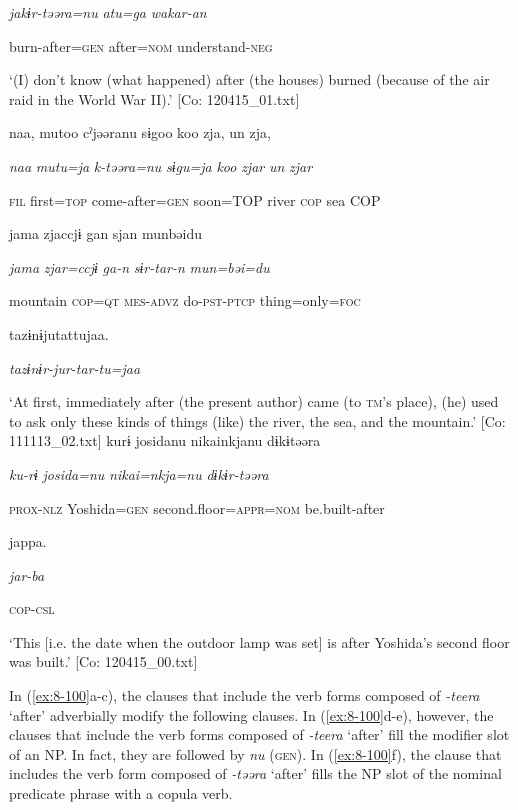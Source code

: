       \textit{jakɨr-təəra=nu}  \textit{atu=ga}  \textit{wakar-an}

      burn-after=\textsc{gen}  after=\textsc{nom}  understand-\textsc{neg}

\glt ‘(I) don’t know (what happened) after (the houses) burned (because of the air raid in the World War II).’ [Co: 120415\_01.txt]

    {\TM}
\glll  naa,  mutoo  cˀjəəranu  sɨgoo  koo  zja,  un  zja,

      \textit{naa}  \textit{mutu=ja}  \textit{k-təəra=nu}  \textit{sɨgu=ja}  \textit{koo}  \textit{zjar}  \textit{un}  \textit{zjar}

      \textsc{fil}  first=\textsc{top}  come-after=\textsc{gen}  soon=TOP  river  \textsc{cop}  sea  COP

      jama  zjaccjɨ  gan  sjan  munbəidu

      \textit{jama}  \textit{zjar=ccjɨ}  \textit{ga-n}  \textit{sɨr-tar-n}  \textit{mun=bəi=du}

      mountain  \textsc{cop}=\textsc{qt}  \textsc{mes}-\textsc{advz}  do-\textsc{pst}-\textsc{ptcp}  thing=only=\textsc{foc}

      tazɨnɨjutattujaa.

      \textit{tazɨnɨr-jur-tar-tu=jaa}

\glt ‘At first, immediately after (the present author) came (to \textsc{tm}’s place), (he) used to ask only these kinds of things (like) the river, the sea, and the mountain.’ [Co: 111113\_02.txt]
\ex {\TM}
\glll  kurɨ  josidanu  {\textbar}nikai{\textbar}nkjanu  dɨkɨtəəra

      \textit{ku-rɨ}  \textit{josida=nu}  \textit{nikai=nkja=nu}  \textit{dɨkɨr-təəra}

      \textsc{prox}-\textsc{nlz}  Yoshida=\textsc{gen}  second.floor=\textsc{appr}=\textsc{nom}  be.built-after

      jappa.

      \textit{jar-ba}

      \textsc{cop}-\textsc{csl}

\glt ‘This [i.e. the date when the outdoor lamp was set] is after Yoshida’s second floor was built.’ [Co: 120415\_00.txt]
\z

In (\ref{ex:8-100}a-c), the clauses that include the verb forms composed of \textit{{}-teera} ‘after’ adverbially modify the following clauses. In (\ref{ex:8-100}d-e), however, the clauses that include the verb forms composed of \textit{{}-teera} ‘after’ fill the modifier slot of an NP. In fact, they are followed by \textit{nu} (\textsc{gen}). In (\ref{ex:8-100}f), the clause that includes the verb form composed of \textit{{}-təəra} ‘after’ fills the NP slot of the nominal predicate phrase with a copula verb.

